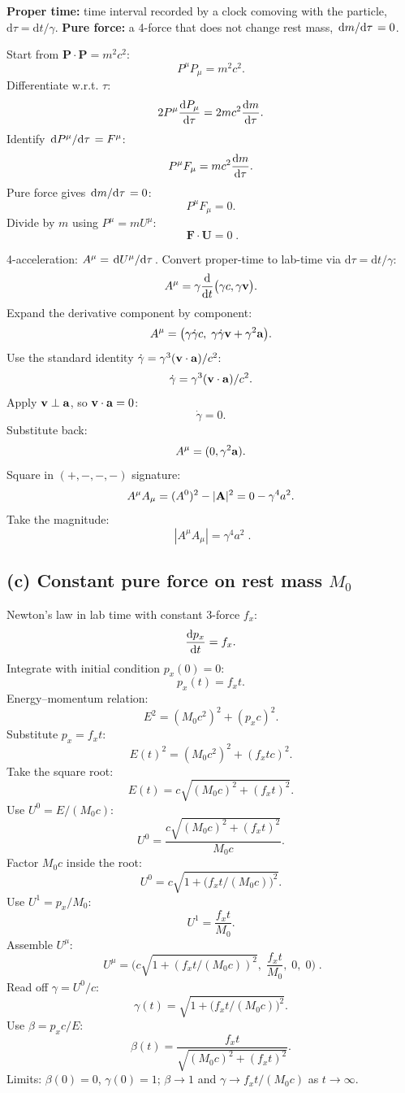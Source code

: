 \documentclass[11pt]{article}
\newcommand{\de}{\mathrm{d}}
\begin{document}
\textbf{Proper time:} time interval recorded by a clock comoving with the particle, $\de\tau = \de t/\gamma$.
\textbf{Pure force:} a 4-force that does not change rest mass, $\dv*{m}{\tau}=0$.

Start from $\bm P\cdot\bm P = m^2 c^2$:
\[
P^\mu P_\mu = m^2 c^2.
\]
Differentiate w.r.t. $\tau$:
\[
2 P^\mu \dv{P_\mu}{\tau} = 2 m c^2 \dv{m}{\tau}.
\]
Identify $\dv*{P^\mu}{\tau}=F^\mu$:
\[
P^\mu F_\mu = m c^2 \dv{m}{\tau}.
\]
Pure force gives $\dv*{m}{\tau}=0$:
\[
P^\mu F_\mu = 0.
\]
Divide by $m$ using $P^\mu = m U^\mu$:
\[
\boxed{\;\bm F\cdot\bm U = 0\;}.
\]

4-acceleration: $A^\mu = \dv*{U^\mu}{\tau}$. Convert proper-time to lab-time via $\de\tau=\de t/\gamma$:
\[
A^\mu = \gamma\dv{t}\bigl(\gamma c,\gamma\vb v\bigr).
\]
Expand the derivative component by component:
\[
A^\mu = \bigl(\gamma\dot\gamma c,\;\gamma\dot\gamma\vb v + \gamma^2\vb a\bigr).
\]
Use the standard identity $\dot\gamma = \gamma^3(\vb v\cdot\vb a)/c^2$:
\[
\dot\gamma = \gamma^3(\vb v\cdot\vb a)/c^2.
\]
Apply $\vb v\perp\vb a$, so $\vb v\cdot\vb a = 0$:
\[
\dot\gamma = 0.
\]
Substitute back:
\[
A^\mu = (0,\gamma^2 \vb a).
\]
Square in $(+,-,-,-)$ signature:
\[
A^\mu A_\mu = (A^0)^2 - |\vb A|^2 = 0 - \gamma^4 a^2.
\]
Take the magnitude:
\[
\boxed{\;|A^\mu A_\mu| = \gamma^4 a^2\;}.
\]

\subsection*{(c) Constant pure force on rest mass $M_0$}

Newton's law in lab time with constant 3-force $f_x$:
\[
\dv{p_x}{t} = f_x.
\]
Integrate with initial condition $p_x(0)=0$:
\[
p_x(t) = f_x t.
\]
Energy--momentum relation:
\[
E^2 = (M_0 c^2)^2 + (p_x c)^2.
\]
Substitute $p_x = f_x t$:
\[
E(t)^2 = (M_0 c^2)^2 + (f_x t c)^2.
\]
Take the square root:
\[
E(t) = c\sqrt{(M_0 c)^2 + (f_x t)^2}.
\]
Use $U^0 = E/(M_0 c)$:
\[
U^0 = \frac{c\sqrt{(M_0 c)^2 + (f_x t)^2}}{M_0 c}.
\]
Factor $M_0 c$ inside the root:
\[
U^0 = c\sqrt{1+\bigl(f_x t/(M_0 c)\bigr)^2}.
\]
Use $U^1 = p_x/M_0$:
\[
U^1 = \frac{f_x t}{M_0}.
\]
Assemble $U^\mu$:
\[
\boxed{\;U^\mu = \biggl(c\sqrt{1 + (f_x t/(M_0 c))^2},\;\frac{f_x t}{M_0},\;0,\;0\biggr)\;}.
\]
Read off $\gamma = U^0/c$:
\[
\gamma(t) = \sqrt{1 + \bigl(f_x t/(M_0 c)\bigr)^2}.
\]
Use $\beta = p_x c/E$:
\[
\beta(t) = \frac{f_x t}{\sqrt{(M_0 c)^2 + (f_x t)^2}}.
\]
Limits: $\beta(0)=0$, $\gamma(0)=1$; $\beta\to 1$ and $\gamma\to f_x t/(M_0 c)$ as $t\to\infty$.
\end{document}
